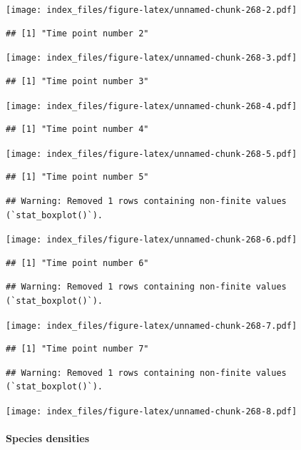 \documentclass[
]{article}
\begin{document}
\texttt{[image: index\_files/figure-latex/unnamed-chunk-268-2.pdf]}

\begin{verbatim}
## [1] "Time point number 2"
\end{verbatim}

\texttt{[image: index\_files/figure-latex/unnamed-chunk-268-3.pdf]}

\begin{verbatim}
## [1] "Time point number 3"
\end{verbatim}

\texttt{[image: index\_files/figure-latex/unnamed-chunk-268-4.pdf]}

\begin{verbatim}
## [1] "Time point number 4"
\end{verbatim}

\texttt{[image: index\_files/figure-latex/unnamed-chunk-268-5.pdf]}

\begin{verbatim}
## [1] "Time point number 5"
\end{verbatim}

\begin{verbatim}
## Warning: Removed 1 rows containing non-finite values (`stat_boxplot()`).
\end{verbatim}

\texttt{[image: index\_files/figure-latex/unnamed-chunk-268-6.pdf]}

\begin{verbatim}
## [1] "Time point number 6"
\end{verbatim}

\begin{verbatim}
## Warning: Removed 1 rows containing non-finite values (`stat_boxplot()`).
\end{verbatim}

\texttt{[image: index\_files/figure-latex/unnamed-chunk-268-7.pdf]}

\begin{verbatim}
## [1] "Time point number 7"
\end{verbatim}

\begin{verbatim}
## Warning: Removed 1 rows containing non-finite values (`stat_boxplot()`).
\end{verbatim}

\texttt{[image: index\_files/figure-latex/unnamed-chunk-268-8.pdf]}

\hypertarget{species-densities}{%
\paragraph{Species densities}\label{species-densities}}
\end{document}
